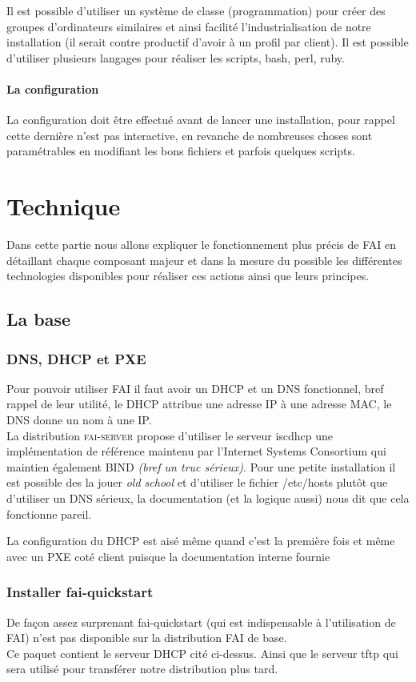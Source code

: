 \documentclass[a4paper,12pt,one side,titlepage]{report}
\begin{document}
Il est possible d'utiliser un système de classe (programmation) pour créer des groupes d'ordinateurs similaires et ainsi facilité l'industrialisation de notre installation (il serait contre productif d'avoir à un profil par client). Il est possible d'utiliser plusieurs langages pour réaliser les scripts, bash, perl, ruby.

\subsubsection{La configuration}
La configuration doit être effectué avant de lancer une installation, pour rappel cette dernière n'est pas interactive, en revanche de nombreuses choses sont paramétrables en modifiant les bons fichiers et parfois quelques scripts.


\chapter{Technique}
Dans cette partie nous allons expliquer le fonctionnement plus précis de FAI en détaillant chaque composant majeur et dans la mesure du possible les différentes technologies disponibles pour réaliser ces actions ainsi que leurs principes.

\section{La base}


\subsection{DNS, DHCP et PXE}
Pour pouvoir utiliser \textsc{FAI} il faut avoir un DHCP et un DNS fonctionnel, bref rappel de leur utilité, le DHCP attribue une adresse IP à une adresse MAC, le DNS donne un nom à une IP.\\
La distribution \textsc{fai-server} propose d'utiliser le serveur iscdhcp une implémentation de référence maintenu par l'Internet Systems Consortium qui maintien également BIND \textit{(bref un truc sérieux)}. 
Pour une petite installation il est possible des la jouer \textit{old school} et d'utiliser le fichier /etc/hosts plutôt que d'utiliser un DNS sérieux, la documentation (et la logique aussi) nous dit que cela fonctionne pareil.

La configuration du DHCP est aisé même quand c'est la première fois et même avec un PXE coté client puisque la documentation interne fournie 


\subsection{Installer fai-quickstart}
De façon assez surprenant fai-quickstart (qui est indispensable à l'utilisation de FAI) n'est pas disponible sur la distribution FAI de base.\\
Ce paquet contient le serveur DHCP cité ci-dessus. Ainsi que le serveur tftp qui sera utilisé pour transférer notre distribution plus tard.
\end{document}
